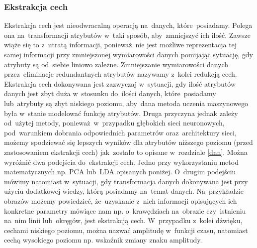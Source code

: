 
\subsubsection{Ekstrakcja cech}
Ekstrakcja cech jest nieodwracalną operacją na~danych, które~posiadamy. Polega ona na~transformacji atrybutów w~taki sposób, aby~zmniejszyć ich ilość. Zawsze wiąże się to z~utratą informacji, ponieważ~nie jest możliwe reprezentacja tej samej informacji przy zmniejszonej wymiarowości danych pomijając sytuację, gdy atrybuty są od~siebie liniowo zależne. Zmniejszanie wymiarowości danych przez~eliminacje redundantnych atrybutów nazywamy z~kolei redukcją cech. 
Ekstrakcja cech dokonywana jest zazwyczaj w~sytuacji, gdy ilość atrybutów danych jest zbyt duża w~stosunku do~ilości danych, które~posiadamy lub~atrybuty są zbyt niskiego poziomu, aby~dana metoda uczenia maszynowego była w~stanie modelować funkcję atrybutów. Druga przyczyna jednak zależy od~użytej metody, ponieważ~w~przypadku głębokich sieci neuronowych, pod~warunkiem dobrania odpowiednich parametrów oraz~architektury sieci, możemy spodziewać się lepszych wyników dla atrybutów niższego poziomu (przed zastosowaniem ekstrakcji cech) jak~zostało to opisane w~rozdziale \ref{dnn}. Można wyróżnić dwa podejścia do~ekstrakcji cech. Jedno przy wykorzystaniu metod matematycznych np. PCA lub~LDA opisanych poniżej. O~drugim podejściu mówimy natomiast w~sytuacji, gdy transformacja danych dokonywana jest przy użyciu dodatkowej wiedzy, którą posiadamy na~temat danych. Na~przykładzie obrazów możemy powiedzieć, że~uzyskanie z~nich informacji opisujących ich konkretne parametry mówiące nam np. o~krawędziach na~obrazie czy~istnieniu na~nim linii lub~okręgów, jest ekstrakcją cech. W~przypadku z~kolei dźwięku, cechami niskiego poziomu, można nazwać amplitudę w~funkcji czasu, natomiast cechą wysokiego poziomu np. wskaźnik zmiany znaku amplitudy.
